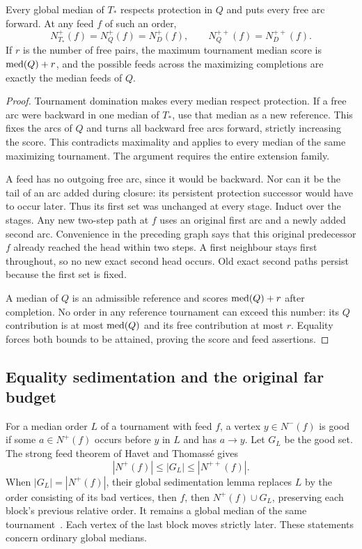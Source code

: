 \begin{theorem}\label{thm:paper-feed-invariance}
Every global median of $T_*$ respects protection in $Q$ and puts every free
arc forward. At any feed $f$ of such an order,
\[
 N_{T_*}^+(f)=N_Q^+(f)=N_D^+(f),\qquad
 N_Q^{++}(f)=N_D^{++}(f).
\]
If $r$ is the number of free pairs, the maximum tournament median score is
$\operatorname{med}(Q)+r$, and the possible feeds across the maximizing completions are
exactly the median feeds of $Q$.
\end{theorem}
\begin{proof}
Tournament domination makes every median respect protection. If a free arc
were backward in one median of $T_*$, use that median as a new reference.
This fixes the arcs of $Q$ and turns all backward free arcs forward,
strictly increasing the score. This contradicts maximality and applies to
every median of the same maximizing tournament. The argument requires the
entire extension family.

A feed has no outgoing free arc, since it would be backward. Nor can it be
the tail of an arc added during closure: its persistent protection successor
would have to occur later. Thus its first set was unchanged at every stage.
Induct over the stages. Any new two-step path at $f$ uses an original first
arc and a newly added second arc. Convenience in the preceding graph says
that this original predecessor $f$ already reached the head within two steps.
A first neighbour stays first throughout, so no new exact second head occurs.
Old exact second paths persist because the first set is fixed.

A median of $Q$ is an admissible reference and scores $\operatorname{med}(Q)+r$ after
completion. No order in any reference tournament can exceed this number:
its $Q$ contribution is at most $\operatorname{med}(Q)$ and its free contribution at most
$r$. Equality forces both bounds to be attained, proving the score and feed
assertions.
\end{proof}

\subsection{Equality sedimentation and the original far budget}
For a median order $L$ of a tournament with feed $f$, a vertex
$y\in N^-(f)$ is good if some $a\in N^+(f)$ occurs before $y$ in $L$ and
has $a\to y$. Let $G_L$ be the good set. The strong feed theorem of
Havet and Thomass\'e gives
\[
 |N^+(f)|\le |G_L|\le |N^{++}(f)|.
\]
When $|G_L|=|N^+(f)|$, their global sedimentation lemma replaces $L$ by
the order consisting of its bad vertices, then $f$, then $N^+(f)\cup G_L$,
preserving each block's previous relative order. It remains a global median
of the same tournament~\cite{HavetThomasse2000}. Each vertex of the last
block moves strictly later. These statements concern ordinary global medians.

